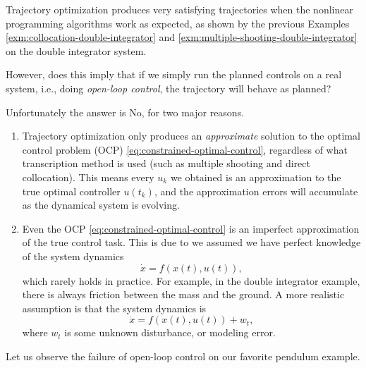 \documentclass[
]{book}
\theoremstyle{definition}
\theoremstyle{definition}
\theoremstyle{definition}
\theoremstyle{definition}
\theoremstyle{remark}
\begin{document}
Trajectory optimization produces very satisfying trajectories when the nonlinear programming algorithms work as expected, as shown by the previous Examples \ref{exm:collocation-double-integrator} and \ref{exm:multiple-shooting-double-integrator} on the double integrator system.

However, does this imply that if we simply run the planned controls on a real system, i.e., doing \emph{open-loop control}, the trajectory will behave as planned?

Unfortunately the answer is No, for two major reasons.

\begin{enumerate}
\def\labelenumi{\arabic{enumi}.}
\item
  Trajectory optimization only produces an \emph{approximate} solution to the optimal control problem (OCP) \eqref{eq:constrained-optimal-control}, regardless of what transcription method is used (such as multiple shooting and direct collocation). This means every \(u_k\) we obtained is an approximation to the true optimal controller \(u(t_k)\), and the approximation errors will accumulate as the dynamical system is evolving.
\item
  Even the OCP \eqref{eq:constrained-optimal-control} is an imperfect approximation of the true control task. This is due to we assumed we have perfect knowledge of the system dynamics
  \[
  \dot{x} = f(x(t),u(t)),
  \]
  which rarely holds in practice. For example, in the double integrator example, there is always friction between the mass and the ground. A more realistic assumption is that the system dynamics is
  \[
  \dot{x} = f(x(t),u(t)) + w_t,
  \]
  where \(w_t\) is some unknown disturbance, or modeling error.
\end{enumerate}

Let us observe the failure of open-loop control on our favorite pendulum example.
\end{document}
